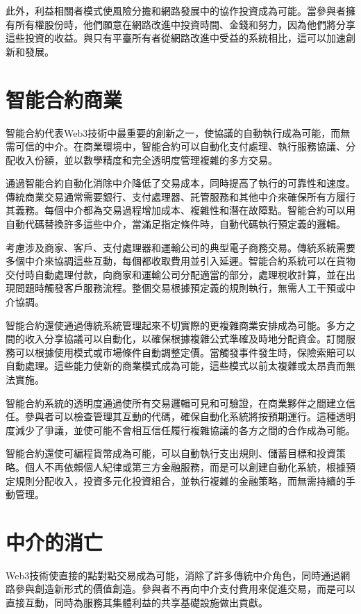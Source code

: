 \documentclass[
  Letterpaper,
]{scrbook}
\begin{document}
此外，利益相關者模式使風險分擔和網路發展中的協作投資成為可能。當參與者擁有所有權股份時，他們願意在網路改進中投資時間、金錢和努力，因為他們將分享這些投資的收益。與只有平臺所有者從網路改進中受益的系統相比，這可以加速創新和發展。

\section{智能合約商業}\label{ux667aux80fdux5408ux7d04ux5546ux696d}

智能合約代表Web3技術中最重要的創新之一，使協議的自動執行成為可能，而無需可信的中介。在商業環境中，智能合約可以自動化支付處理、執行服務協議、分配收入份額，並以數學精度和完全透明度管理複雜的多方交易。

通過智能合約自動化消除中介降低了交易成本，同時提高了執行的可靠性和速度。傳統商業交易通常需要銀行、支付處理器、託管服務和其他中介來確保所有方履行其義務。每個中介都為交易過程增加成本、複雜性和潛在故障點。智能合約可以用自動代碼替換許多這些中介，當滿足指定條件時，自動代碼執行預定義的邏輯。

考慮涉及商家、客戶、支付處理器和運輸公司的典型電子商務交易。傳統系統需要多個中介來協調這些互動，每個都收取費用並引入延遲。智能合約系統可以在貨物交付時自動處理付款，向商家和運輸公司分配適當的部分，處理稅收計算，並在出現問題時觸發客戶服務流程。整個交易根據預定義的規則執行，無需人工干預或中介協調。

智能合約還使通過傳統系統管理起來不切實際的更複雜商業安排成為可能。多方之間的收入分享協議可以自動化，以確保根據複雜公式準確及時地分配資金。訂閱服務可以根據使用模式或市場條件自動調整定價。當觸發事件發生時，保險索賠可以自動處理。這些能力使新的商業模式成為可能，這些模式以前太複雜或太昂貴而無法實施。

智能合約系統的透明度通過使所有交易邏輯可見和可驗證，在商業夥伴之間建立信任。參與者可以檢查管理其互動的代碼，確保自動化系統將按預期運行。這種透明度減少了爭議，並使可能不會相互信任履行複雜協議的各方之間的合作成為可能。

智能合約還使可編程貨幣成為可能，可以自動執行支出規則、儲蓄目標和投資策略。個人不再依賴個人紀律或第三方金融服務，而是可以創建自動化系統，根據預定規則分配收入，投資多元化投資組合，並執行複雜的金融策略，而無需持續的手動管理。

\section{中介的消亡}\label{ux4e2dux4ecbux7684ux6d88ux4ea1}

Web3技術使直接的點對點交易成為可能，消除了許多傳統中介角色，同時通過網路參與創造新形式的價值創造。參與者不再向中介支付費用來促進交易，而是可以直接互動，同時為服務其集體利益的共享基礎設施做出貢獻。
\end{document}
